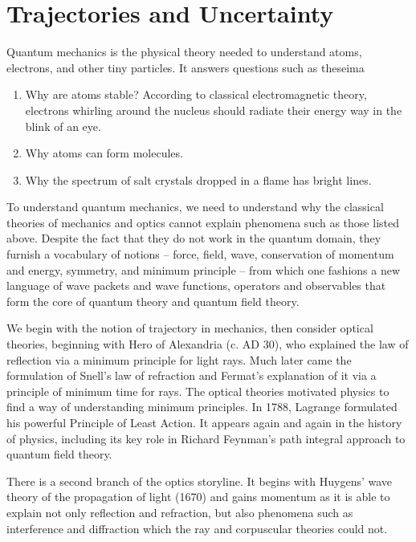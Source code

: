 
\maintableofcontents


\section{Trajectories and Uncertainty}


\innertableofcontents


Quantum mechanics is the physical theory needed to understand atoms, electrons, and other tiny particles.  It answers questions such as theseima

\begin{enumerate}
\item Why are atoms stable? According to classical electromagnetic theory, electrons whirling around the nucleus should radiate their energy way in the blink of an eye.

\item Why atoms can form molecules.

\item Why the spectrum of salt crystals dropped in a flame has bright lines.
\end{enumerate}

To understand quantum mechanics, we need to understand why the classical theories of mechanics and optics cannot explain phenomena such as those listed above.  Despite the fact that they do not work in the quantum domain, they furnish a vocabulary of notions -- force, field, wave, conservation of momentum and energy, symmetry, and minimum principle -- from which one fashions a new language of wave packets and wave functions, operators and observables that form the core of quantum theory and quantum field theory.

We begin with the notion of trajectory in mechanics, then consider optical theories, beginning with Hero of Alexandria (c. AD 30), who explained the law of reflection via a minimum principle for light rays.  Much later came the formulation of Snell's law of refraction and Fermat's explanation of it via a principle of minimum time for rays.  The optical theories motivated physics to find a way of understanding minimum principles.  In 1788, Lagrange formulated his powerful Principle of Least Action. It appears again and again in the history of physics, including its key role in Richard Feynman's path integral approach to quantum field theory.

There is a second branch of the optics storyline.  It begins with Huygens' wave theory of the propagation of light (1670) and gains momentum as it is able to explain not only reflection and refraction, but also phenomena such as interference and diffraction which the ray and corpuscular theories could not.

